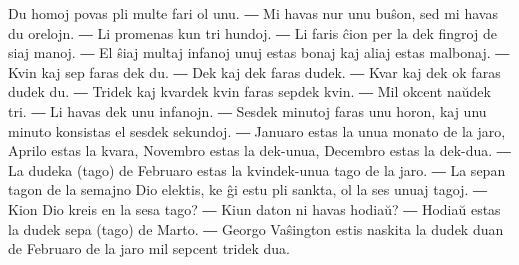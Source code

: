 
Du homoj povas pli multe fari ol unu. ― Mi havas nur unu buŝon, sed mi havas du orelojn. ― Li promenas kun tri hundoj. ― Li faris ĉion per la dek fingroj de siaj manoj. ― El ŝiaj multaj infanoj unuj estas bonaj kaj aliaj estas malbonaj. ― Kvin kaj sep faras dek du. ― Dek kaj dek faras dudek. ― Kvar kaj dek ok faras dudek du. ― Tridek kaj kvardek kvin faras sepdek kvin. ― Mil okcent naŭdek tri. ― Li havas dek unu infanojn. ― Sesdek minutoj faras unu horon, kaj unu minuto konsistas el sesdek sekundoj. ― Januaro estas la unua monato de la jaro, Aprilo estas la kvara, Novembro estas la dek-unua, Decembro estas la dek-dua. ― La dudeka (tago) de Februaro estas la kvindek-unua tago de la jaro. ― La sepan tagon de la semajno Dio elektis, ke ĝi estu pli sankta, ol la ses unuaj tagoj. ― Kion Dio kreis en la sesa tago? ― Kiun daton ni havas hodiaŭ? ― Hodiaŭ estas la dudek sepa (tago) de Marto. ― Georgo Vaŝington estis naskita la dudek duan de Februaro de la jaro mil sepcent tridek dua.

